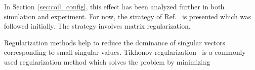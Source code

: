 



In Section~\ref{sec:coil_config}, this effect has been analyzed further in both simulation and experiment. For now, the strategy of Ref.~\cite{bea} is presented which was followed initially. The strategy involves matrix regularization.

Regularization methods help to reduce the dominance of singular vectors corresponding to small singular values. Tikhonov regularization~\cite{tikhonov2013numerical,tikhonov_book,svd,svd3} is a commonly used regularization method which solves the problem by minimizing 

